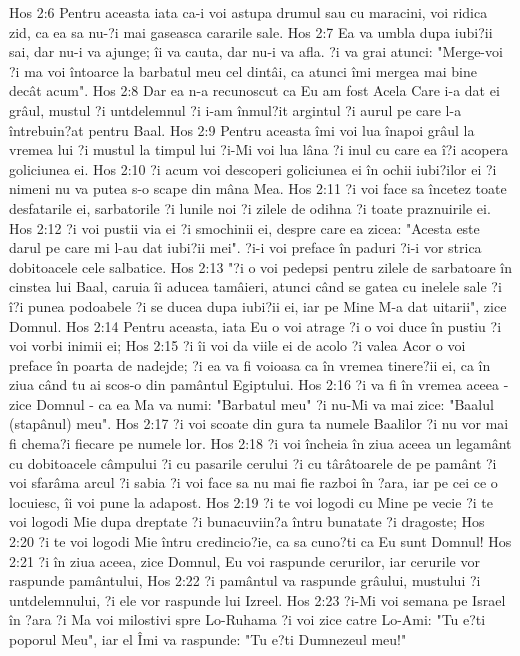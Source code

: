 Hos 2:6  Pentru aceasta iata ca-i voi astupa drumul sau cu maracini, voi ridica zid, ca ea sa nu-?i mai gaseasca cararile sale.
Hos 2:7  Ea va umbla dupa iubi?ii sai, dar nu-i va ajunge; îi va cauta, dar nu-i va afla. ?i va grai atunci: "Merge-voi ?i ma voi întoarce la barbatul meu cel dintâi, ca atunci îmi mergea mai bine decât acum".
Hos 2:8  Dar ea n-a recunoscut ca Eu am fost Acela Care i-a dat ei grâul, mustul ?i untdelemnul ?i i-am înmul?it argintul ?i aurul pe care l-a întrebuin?at pentru Baal.
Hos 2:9  Pentru aceasta îmi voi lua înapoi grâul la vremea lui ?i mustul la timpul lui ?i-Mi voi lua lâna ?i inul cu care ea î?i acopera goliciunea ei.
Hos 2:10  ?i acum voi descoperi goliciunea ei în ochii iubi?ilor ei ?i nimeni nu va putea s-o scape din mâna Mea.
Hos 2:11  ?i voi face sa încetez toate desfatarile ei, sarbatorile ?i lunile noi ?i zilele de odihna ?i toate praznuirile ei.
Hos 2:12  ?i voi pustii via ei ?i smochinii ei, despre care ea zicea: "Acesta este darul pe care mi l-au dat iubi?ii mei". ?i-i voi preface în paduri ?i-i vor strica dobitoacele cele salbatice.
Hos 2:13  "?i o voi pedepsi pentru zilele de sarbatoare în cinstea lui Baal, caruia îi aducea tamâieri, atunci când se gatea cu inelele sale ?i î?i punea podoabele ?i se ducea dupa iubi?ii ei, iar pe Mine M-a dat uitarii", zice Domnul.
Hos 2:14  Pentru aceasta, iata Eu o voi atrage ?i o voi duce în pustiu ?i voi vorbi inimii ei;
Hos 2:15  ?i îi voi da viile ei de acolo ?i valea Acor o voi preface în poarta de nadejde; ?i ea va fi voioasa ca în vremea tinere?ii ei, ca în ziua când tu ai scos-o din pamântul Egiptului.
Hos 2:16  ?i va fi în vremea aceea - zice Domnul - ca ea Ma va numi: "Barbatul meu" ?i nu-Mi va mai zice: "Baalul (stapânul) meu".
Hos 2:17  ?i voi scoate din gura ta numele Baalilor ?i nu vor mai fi chema?i fiecare pe numele lor.
Hos 2:18  ?i voi încheia în ziua aceea un legamânt cu dobitoacele câmpului ?i cu pasarile cerului ?i cu târâtoarele de pe pamânt ?i voi sfarâma arcul ?i sabia ?i voi face sa nu mai fie razboi în ?ara, iar pe cei ce o locuiesc, îi voi pune la adapost.
Hos 2:19  ?i te voi logodi cu Mine pe vecie ?i te voi logodi Mie dupa dreptate ?i bunacuviin?a întru bunatate ?i dragoste;
Hos 2:20  ?i te voi logodi Mie întru credincio?ie, ca sa cuno?ti ca Eu sunt Domnul!
Hos 2:21  ?i în ziua aceea, zice Domnul, Eu voi raspunde cerurilor, iar cerurile vor raspunde pamântului,
Hos 2:22  ?i pamântul va raspunde grâului, mustului ?i untdelemnului, ?i ele vor raspunde lui Izreel.
Hos 2:23  ?i-Mi voi semana pe Israel în ?ara ?i Ma voi milostivi spre Lo-Ruhama ?i voi zice catre Lo-Ami: "Tu e?ti poporul Meu", iar el Îmi va raspunde: "Tu e?ti Dumnezeul meu!"
